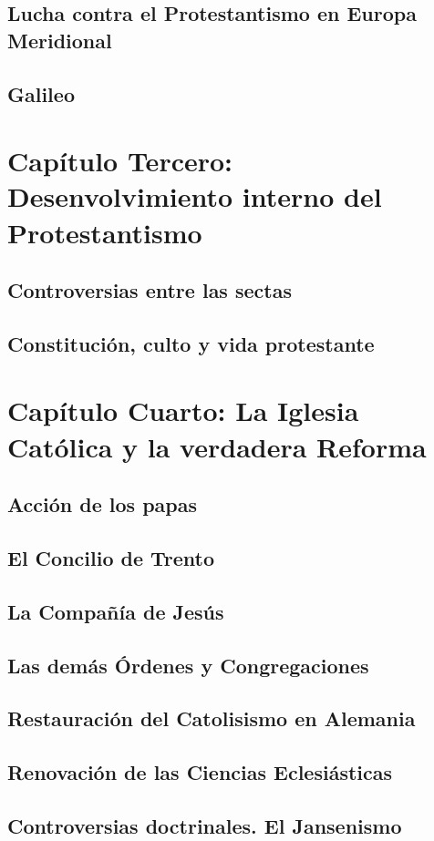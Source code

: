 \raggedbottom{} \documentclass[12pt, a4paper, openany]{book} %
\begin{document}
\section{Lucha contra el Protestantismo en Europa Meridional}
\section{Galileo}
\chapter{Capítulo Tercero: Desenvolvimiento interno del Protestantismo}
\section{Controversias entre las sectas}
\section{Constitución, culto y vida protestante}
\chapter{Capítulo Cuarto: La Iglesia Católica y la verdadera Reforma}
\section{Acción de los papas}
\section{El Concilio de Trento}
\section{La Compañía de Jesús}
\section{Las demás Órdenes y Congregaciones}
\section{Restauración del Catolisismo en Alemania}
\section{Renovación de las Ciencias Eclesiásticas}
\section{Controversias doctrinales. El Jansenismo}
\end{document}

